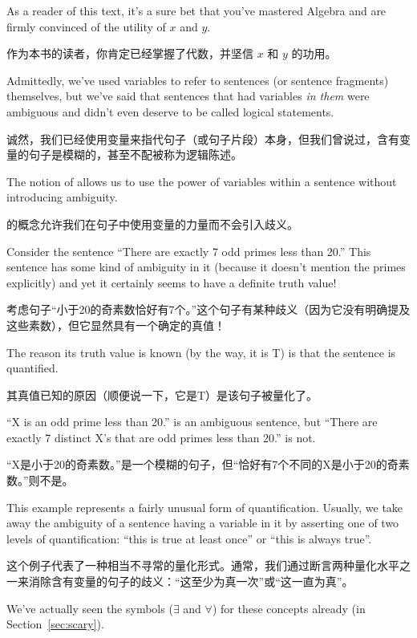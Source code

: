 As a reader of this text, it's a sure bet that you've mastered
Algebra and are firmly convinced of the utility of $x$ and $y$.

作为本书的读者，你肯定已经掌握了代数，并坚信 $x$ 和 $y$ 的功用。

Admittedly,
we've used variables to refer to sentences (or sentence fragments) themselves,
but we've said that sentences that had variables {\em in them} were ambiguous 
and didn't even deserve to be called logical statements.

诚然，我们已经使用变量来指代句子（或句子片段）本身，但我们曾说过，含有变量的句子是模糊的，甚至不配被称为逻辑陈述。

The notion 
of  
allows us to use the power of variables within a
sentence without introducing ambiguity.

的概念允许我们在句子中使用变量的力量而不会引入歧义。

Consider the sentence ``There are exactly 7 odd primes less than 20.''  
This sentence has some kind of ambiguity in it (because it doesn't mention
the primes explicitly) and yet it certainly seems to have a definite 
truth value!

考虑句子“小于20的奇素数恰好有7个。”这个句子有某种歧义（因为它没有明确提及这些素数），但它显然具有一个确定的真值！

The reason its truth value is known (by the way, it is T)
is that the sentence is quantified.

其真值已知的原因（顺便说一下，它是T）是该句子被量化了。

``X is an odd prime less than 20.'' 
is an ambiguous sentence, but ``There are exactly 7 distinct X's that
are odd primes less than 20.'' is not.

“X是小于20的奇素数。”是一个模糊的句子，但“恰好有7个不同的X是小于20的奇素数。”则不是。

This example represents a fairly
unusual form of quantification.  Usually, we take away the ambiguity
of a sentence having a variable in it by asserting one of two levels 
of quantification: ``this is true at least once'' or ``this is always true''.

这个例子代表了一种相当不寻常的量化形式。通常，我们通过断言两种量化水平之一来消除含有变量的句子的歧义：“这至少为真一次”或“这一直为真”。

We've actually seen the symbols ($\exists$ and $\forall$) for these 
concepts already (in Section~\ref{sec:scary}).

